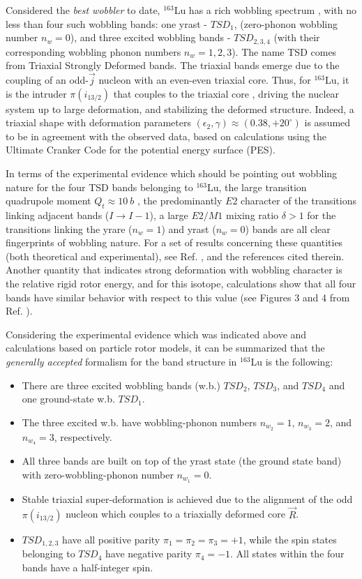 \documentclass[myclassdoc,debug]{rjparticle}
\begin{document}
Considered the \emph{best wobbler} to date, $^{163}$Lu has a rich wobbling spectrum \cite{odegaard2001evidence,jensen2002evidence}, with no less than four such wobbling bands: one yrast - $TSD_1$, (zero-phonon wobbling number $n_w=0$), and three excited wobbling bands - $TSD_{2,3,4}$ (with their corresponding wobbling phonon numbers $n_w=1,2,3$). The name TSD comes from Triaxial Strongly Deformed bands. The triaxial bands emerge due to the coupling of an odd-$\vec{j}$ nucleon with an even-even triaxial core. Thus, for $^{163}$Lu, it is the intruder $\pi(i_{13/2})$ that couples to the triaxial core \cite{odegaard2001evidence,hamamoto2002wobbling,jensen2002wobbling}, driving the nuclear system up to large deformation, and stabilizing the deformed structure. Indeed, a triaxial shape with deformation parameters $(\epsilon_2,\gamma)\approx(0.38,+20^\circ)$ is assumed to be in agreement with the observed data, based on calculations using the Ultimate Cranker Code \cite{bengtsson1990high} for the potential energy surface (PES).

In terms of the experimental evidence which should be pointing out wobbling nature for the four TSD bands belonging to $^{163}$Lu, the large transition quadrupole moment $Q_t \approx 10\ b$ \cite{gorgen2004quadrupole}, the predominantly $E2$ character of the transitions linking adjacent bands ($I\to I-1$), a large $E2/M1$ mixing ratio $\delta>1$ for the transitions linking the yrare ($n_w=1$) and yrast ($n_w=0$) bands are all clear fingerprints of wobbling nature. For a set of results concerning these quantities (both theoretical and experimental), see Ref. \cite{raduta2017semiclassical}, and the references cited therein. Another quantity that indicates strong deformation with wobbling character is the relative rigid rotor energy, and for this isotope, calculations show that all four bands have similar behavior with respect to this value (see Figures 3 and 4 from Ref. \cite{hagemann2005triaxiality}).

Considering the experimental evidence which was indicated above and calculations based on particle rotor models, it can be summarized that the \emph{generally accepted} formalism for the band structure in $^{163}$Lu is the following:
\begin{itemize}
    \item There are three excited wobbling bands (w.b.) $TSD_2$, $TSD_3$, and $TSD_4$ and one ground-state w.b. $TSD_1$.
    \item The three excited w.b. have wobbling-phonon numbers $n_{w_2}=1$, $n_{w_3}=2$, and $n_{w_4}=3$, respectively.
    \item All three bands are built on top of the yrast state (the ground state band) with zero-wobbling-phonon number $n_{w_1}=0$.
    \item Stable triaxial super-deformation is achieved due to the alignment of the odd $\pi(i_{13/2})$ nucleon which couples to a triaxially deformed core $\vec{R}$.
    \item $TSD_{1,2,3}$ have all positive parity $\pi_1=\pi_2=\pi_3=+1$, while the spin states belonging to $TSD_4$ have negative parity $\pi_4=-1$. All states within the four bands have a half-integer spin.
 \end{itemize}
\end{document}
